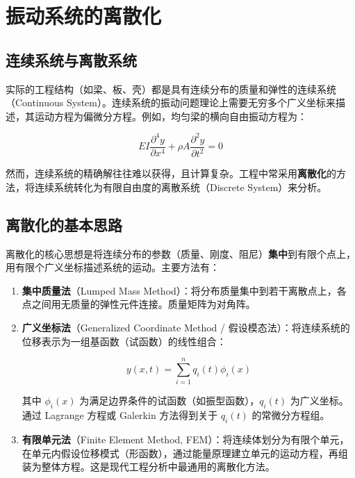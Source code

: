 \section{振动系统的离散化}

\subsection{连续系统与离散系统}

实际的工程结构（如梁、板、壳）都是具有连续分布的质量和弹性的连续系统（Continuous System）。连续系统的振动问题理论上需要无穷多个广义坐标来描述，其运动方程为偏微分方程。例如，均匀梁的横向自由振动方程为：
\begin{myformula}
    \[
    EI\frac{\partial^4 y}{\partial x^4} + \rho A\frac{\partial^2 y}{\partial t^2} = 0
    \]
\end{myformula}

然而，连续系统的精确解往往难以获得，且计算复杂。工程中常采用\textbf{离散化}的方法，将连续系统转化为有限自由度的离散系统（Discrete System）来分析。

\subsection{离散化的基本思路}

离散化的核心思想是将连续分布的参数（质量、刚度、阻尼）\textbf{集中}到有限个点上，用有限个广义坐标描述系统的运动。主要方法有：

\begin{enumerate}
    \item \textbf{集中质量法}（Lumped Mass Method）：将分布质量集中到若干离散点上，各点之间用无质量的弹性元件连接。质量矩阵为对角阵。
    
    \item \textbf{广义坐标法}（Generalized Coordinate Method / 假设模态法）：将连续系统的位移表示为一组基函数（试函数）的线性组合：
    \begin{myformula}
        \[
        y(x,t) = \sum_{i=1}^{n} q_i(t)\phi_i(x)
        \]
    \end{myformula}
    其中 $\phi_i(x)$ 为满足边界条件的试函数（如振型函数），$q_i(t)$ 为广义坐标。通过 Lagrange 方程或 Galerkin 方法得到关于 $q_i(t)$ 的常微分方程组。
    
    \item \textbf{有限单元法}（Finite Element Method, FEM）：将连续体划分为有限个单元，在单元内假设位移模式（形函数），通过能量原理建立单元的运动方程，再组装为整体方程。这是现代工程分析中最通用的离散化方法。
\end{enumerate}

